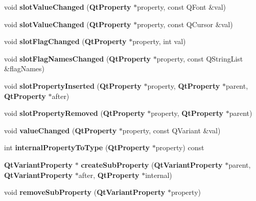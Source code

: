 \begin{DoxyCompactItemize}
void {\bf slot\+Value\+Changed} ({\bf Qt\+Property} $\ast$property, const Q\+Font \&val)
\item 
void {\bf slot\+Value\+Changed} ({\bf Qt\+Property} $\ast$property, const Q\+Cursor \&val)
\item 
void {\bf slot\+Flag\+Changed} ({\bf Qt\+Property} $\ast$property, int val)
\item 
void {\bf slot\+Flag\+Names\+Changed} ({\bf Qt\+Property} $\ast$property, const Q\+String\+List \&flag\+Names)
\item 
void {\bf slot\+Property\+Inserted} ({\bf Qt\+Property} $\ast$property, {\bf Qt\+Property} $\ast$parent, {\bf Qt\+Property} $\ast$after)
\item 
void {\bf slot\+Property\+Removed} ({\bf Qt\+Property} $\ast$property, {\bf Qt\+Property} $\ast$parent)
\item 
void {\bf value\+Changed} ({\bf Qt\+Property} $\ast$property, const Q\+Variant \&val)
\item 
int {\bf internal\+Property\+To\+Type} ({\bf Qt\+Property} $\ast$property) const 
\item 
{\bf Qt\+Variant\+Property} $\ast$ {\bf create\+Sub\+Property} ({\bf Qt\+Variant\+Property} $\ast$parent, {\bf Qt\+Variant\+Property} $\ast$after, {\bf Qt\+Property} $\ast$internal)
\item 
void {\bf remove\+Sub\+Property} ({\bf Qt\+Variant\+Property} $\ast$property)
\end{DoxyCompactItemize}
